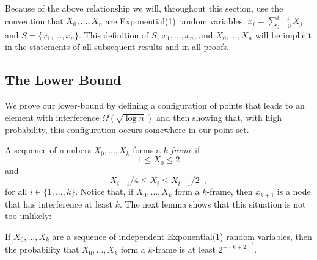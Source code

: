 \documentclass{patmorin}
\begin{document}
Because of the above relationship we will, throughout this section, use
the convention that $X_0,\ldots,X_n$ are Exponential(1) random variables,
$x_i=\sum_{j=0}^{i-1}X_j$, and $S=\{x_1,\ldots,x_n\}$.  This definition
of $S$, $x_1,\ldots,x_n$, and $X_0,\ldots,X_n$ will be implicit in the
statements of all subsequent results and in all proofs.

\subsection{The Lower Bound}

We prove our lower-bound by defining a configuration of points that
leads to an element with interference $\Omega(\sqrt{\log n})$ and then
showing that, with high probability, this configuration occurs somewhere
in our point set.

A sequence of numbers $X_0,\ldots,X_k$ forms a \emph{$k$-frame} if
\[
     1 \le X_0 \le 2
\]
and
\[
     X_{i-1}/4 \le X_i \le X_{i-1}/2 \enspace ,
\]
for all $i\in\{1,\ldots,k\}$.  Notice that, if $X_0,\ldots,X_k$ form a
$k$-frame, then $x_{k+1}$ is a node that has interference at least $k$.
The next lemma shows that this situation is not too unlikely:

\begin{lem}\label{frame}
If $X_0,\ldots,X_k$ are a sequence of independent Exponential(1) random
variables, then the probability that $X_0,\ldots,X_k$ form a $k$-frame
is at least 
$2^{-(k+2)^2}$.
\end{lem}
\end{document}
